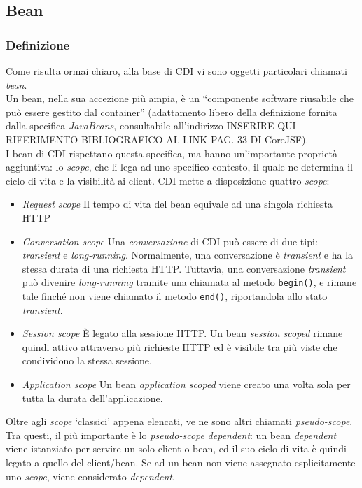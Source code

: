 \subsection{Bean}

\subsubsection{Definizione}
Come risulta ormai chiaro, alla base di CDI vi sono oggetti particolari chiamati \textsl{bean}.\\
Un bean, nella sua accezione più ampia, è un \textquotedblleft componente software riusabile che può essere gestito dal container\textquotedblright{} (adattamento libero della definizione fornita dalla specifica \textsl{JavaBeans}, consultabile all'indirizzo INSERIRE QUI RIFERIMENTO BIBLIOGRAFICO AL LINK PAG. 33 DI CoreJSF).\\
I bean di CDI rispettano questa specifica, ma hanno un'importante proprietà aggiuntiva: lo \textit{scope}, che li lega ad uno specifico contesto, il quale ne determina il ciclo di vita e la visibilità ai client.
CDI mette a disposizione quattro \textit{scope}:
\begin{itemize}
\item \textit{Request scope} Il tempo di vita del bean equivale ad una singola richiesta HTTP
\item \textit{Conversation scope} Una \textsl{conversazione} di CDI può essere di due tipi: \textit{transient} e \textit{long-running}. Normalmente, una conversazione è \textit{transient} e ha la stessa durata di una richiesta HTTP. Tuttavia, una conversazione \textit{transient} può divenire \textit{long-running} tramite una chiamata al metodo \lstinline{begin()}, e rimane tale finché non viene chiamato il metodo \lstinline{end()}, riportandola allo stato \textit{transient}.
\item \textit{Session scope} È legato alla sessione HTTP. Un bean \textit{session scoped} rimane quindi attivo attraverso più richieste HTTP ed è visibile tra più viste che condividono la stessa sessione.
\item \textit{Application scope} Un bean \textit{application scoped} viene creato una volta sola per tutta la durata dell'applicazione.
\end{itemize}

Oltre agli \textit{scope} \textquoteleft classici\textquoteright{} appena elencati, ve ne sono altri chiamati \textit{pseudo-scope}. Tra questi, il più importante è lo \textit{pseudo-scope} \textit{dependent}: un bean \textit{dependent} viene istanziato per servire un solo client o bean, ed il suo ciclo di vita è quindi legato a quello del client/bean. Se ad un bean non viene assegnato esplicitamente uno \textit{scope}, viene considerato \textit{dependent}.\\\\

